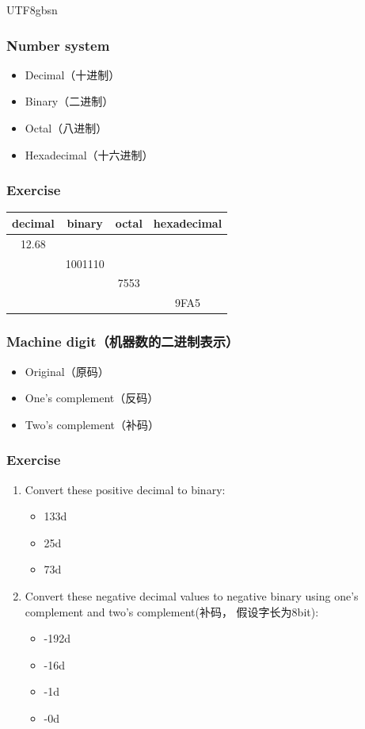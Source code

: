 \documentclass[red]{beamer}
\begin{document}
\begin{CJK*}{UTF8}{gbsn}
\begin{frame}
\frametitle{Number system}
\begin{itemize}
	\item Decimal（十进制）
	\item Binary（二进制）
	\item Octal（八进制）
	\item Hexadecimal（十六进制）
\end{itemize}
\end{frame}

\begin{frame}
\frametitle{Exercise}
\begin{table}[ht]
\begin{tabular}{|c|c|c|c|}
\hline
\textbf{decimal} & \textbf{binary} & \textbf{octal} & \textbf{hexadecimal}\\
\hline
12.68 & & & \\
\hline
& 1001110 & &\\
\hline
& & 7553 & \\
\hline
& & & 9FA5\\
\hline 
\end{tabular}
\end{table}
\end{frame}


\begin{frame}
\frametitle{Machine digit（机器数的二进制表示）}
\begin{itemize}
	\item Original（原码）
	\item One's complement（反码）
	\item Two's complement（补码）
\end{itemize}
\end{frame}

\begin{frame}
\frametitle{Exercise}
\begin{enumerate}
	\item Convert these positive decimal to binary:
	\begin{itemize}
		\item 133d
		\item 25d
		\item 73d
	\end{itemize}
	\item Convert these negative decimal values to negative 
		binary using one's complement and two's complement(补码，
		假设字长为8bit):
	\begin{itemize}
		\item -192d
		\item -16d
		\item -1d
		\item -0d
	\end{itemize}
\end{enumerate}
\end{frame}




\end{CJK*}
\end{document}
